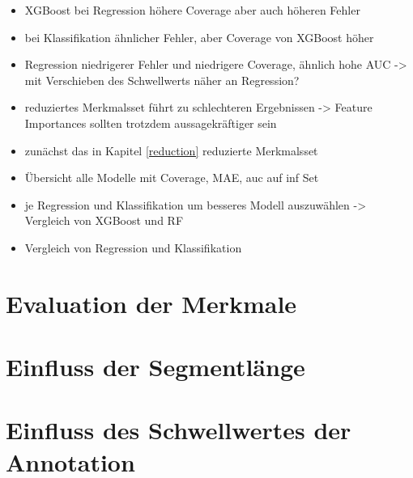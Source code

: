 	\begin{itemize}
		\item \ac{XGBoost} bei Regression höhere Coverage aber auch höheren Fehler
		\item bei Klassifikation ähnlicher Fehler, aber Coverage von \ac{XGBoost} höher
		\item Regression niedrigerer Fehler und niedrigere Coverage, ähnlich hohe AUC -> mit Verschieben des Schwellwerts näher an Regression?
		\item reduziertes Merkmalsset führt zu schlechteren Ergebnissen -> Feature Importances sollten trotzdem aussagekräftiger sein
	\end{itemize}
	
	\begin{itemize}
		\item zunächst das in Kapitel \ref{reduction} reduzierte Merkmalsset
		\item Übersicht alle Modelle mit Coverage, MAE, auc auf inf Set
		\item je Regression und Klassifikation um besseres Modell auszuwählen -> Vergleich von XGBoost und RF
		\item Vergleich von Regression und Klassifikation
	\end{itemize}
	
	\section{Evaluation der Merkmale}

	\section{Einfluss der Segmentlänge}

	\section{Einfluss des Schwellwertes der Annotation}